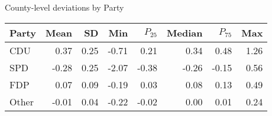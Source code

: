 

\caption{County-level deviations by Party}
\centering
\begin{tabular}[t]{lrrrrrrr}
\toprule
Party & Mean & SD & Min & $P_{25}$ & Median & $P_{75}$ & Max\\
\midrule
CDU & 0.37 & 0.25 & -0.71 & 0.21 & 0.34 & 0.48 & 1.26\\
SPD & -0.28 & 0.25 & -2.07 & -0.38 & -0.26 & -0.15 & 0.56\\
FDP & 0.07 & 0.09 & -0.19 & 0.03 & 0.08 & 0.13 & 0.49\\
Other & -0.01 & 0.04 & -0.22 & -0.02 & 0.00 & 0.01 & 0.24\\
\bottomrule
\end{tabular}
